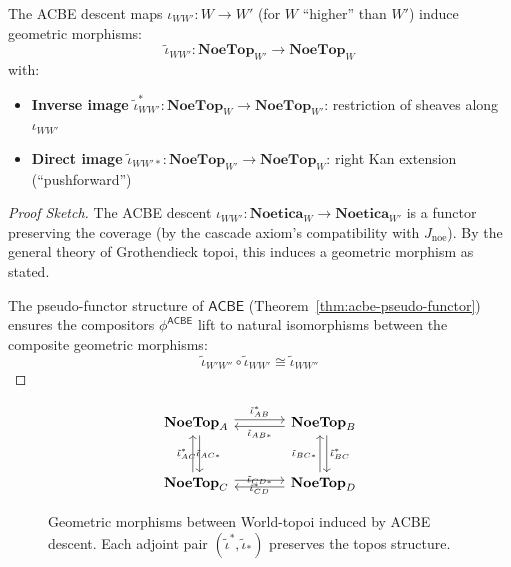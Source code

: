 \begin{theorem}
\label{thm:acbe-geometric}
The ACBE descent maps $\iota_{WW'} : W \to W'$ (for $W$ ``higher'' than $W'$)
induce geometric morphisms:
\[
  \tilde{\iota}_{WW'} : \mathbf{NoeTop}_{W'} \to \mathbf{NoeTop}_W
\]
with:
\begin{itemize}
  \item \textbf{Inverse image} $\tilde{\iota}_{WW'}^* : \mathbf{NoeTop}_W \to \mathbf{NoeTop}_{W'}$:
        restriction of sheaves along $\iota_{WW'}$
  \item \textbf{Direct image} $\tilde{\iota}_{WW'*} : \mathbf{NoeTop}_{W'} \to \mathbf{NoeTop}_W$:
        right Kan extension (``pushforward'')
\end{itemize}
\end{theorem}

\begin{proof}[Proof Sketch]
The ACBE descent $\iota_{WW'} : \mathbf{Noetica}_W \to \mathbf{Noetica}_{W'}$
is a functor preserving the coverage (by the cascade axiom's compatibility
with $J_{\mathrm{noe}}$). By the general theory of Grothendieck topoi, this
induces a geometric morphism as stated.

The pseudo-functor structure of $\mathsf{ACBE}$ (Theorem~\ref{thm:acbe-pseudo-functor})
ensures the compositors $\phi^{\mathsf{ACBE}}$ lift to natural isomorphisms
between the composite geometric morphisms:
\[
  \tilde{\iota}_{W'W''} \circ \tilde{\iota}_{WW'} \cong \tilde{\iota}_{WW''}
\]
\end{proof}

\begin{figure}[ht]
\centering
\[
\begin{tikzcd}[row sep=large, column sep=large]
  \mathbf{NoeTop}_A
    \arrow[r, shift left, "\tilde{\iota}_{AB}^*"]
    \arrow[d, shift left, "\tilde{\iota}_{AC}^*"']
  &
  \mathbf{NoeTop}_B
    \arrow[l, shift left, "\tilde{\iota}_{AB*}"]
    \arrow[d, shift left, "\tilde{\iota}_{BC}^*"]
  \\
  \mathbf{NoeTop}_C
    \arrow[u, shift left, "\tilde{\iota}_{AC*}"']
    \arrow[r, shift left, "\tilde{\iota}_{CD}^*"']
  &
  \mathbf{NoeTop}_D
    \arrow[l, shift left, "\tilde{\iota}_{CD*}"']
    \arrow[u, shift left, "\tilde{\iota}_{BC*}"]
\end{tikzcd}
\]
\caption{Geometric morphisms between World-topoi induced by ACBE descent.
Each adjoint pair $(\tilde{\iota}^*, \tilde{\iota}_*)$ preserves the topos structure.}
\label{fig:world-topoi-geometric}
\end{figure}

